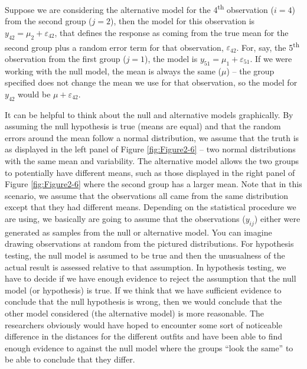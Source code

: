 \documentclass[
]{book}
\begin{document}
Suppose we are considering the alternative model for the 4\textsuperscript{th}
observation (\(i = 4\)) from the second group (\(j = 2\)), then the model for
this observation is \(y_{42} = \mu_2 +\varepsilon_{42}\), that defines the
response as coming from the true mean for the second group plus a
random error term for that observation, \(\varepsilon_{42}\). For, say, the
5\textsuperscript{th} observation from the first group (\(j = 1\)), the model is
\(y_{51} = \mu_1 +\varepsilon_{51}\). If we were working with the null model,
the mean is always the same (\(\mu\)) -- the group specified does not change
the mean we use for that observation, so the model for \(y_{42}\) would be \(\mu +\varepsilon_{42}\).

\indent It can be helpful to think about the null and alternative models graphically.
By assuming the null hypothesis is true (means are equal) and that the random
errors around the mean follow a normal distribution,
we assume that the truth
is as displayed in the left panel of Figure \ref{fig:Figure2-6} -- two
normal distributions with the same mean and variability. The alternative
model allows the two groups to potentially have different means, such as
those displayed in the right panel of Figure \ref{fig:Figure2-6} where the
second group has a larger mean. Note that in this scenario, we assume that
the observations all came from the same distribution except that they had
different means. Depending on the statistical procedure we are using, we
basically are going to assume that the observations (\(y_{ij}\)) either were
generated as samples from the null or alternative model. You can imagine
drawing observations at random from the pictured distributions. For hypothesis
testing, the null model
is assumed to be true and then the unusualness of
the actual result is assessed relative to that assumption. In hypothesis
testing, we have to decide if we have enough evidence to reject the assumption
that the null model (or hypothesis) is true. If we think that we have sufficient evidence to conclude that the null hypothesis is wrong,
then we would conclude that the other model considered (the alternative
model)
is more reasonable. The researchers obviously would have hoped to
encounter some sort of noticeable difference in the distances for the
different outfits and have been able to find enough evidence to against the null
model where the groups ``look the same'' to be able to conclude that they differ.
\end{document}
